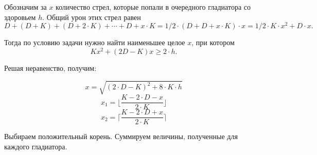 \solutionSection

Обозначим за $x$ количество стрел, которые попали в очередного гладиатора со здоровьем $h$. Общий урон этих стрел равен 
$$D + (D + K) + (D + 2\cdot K) + \cdots + D + x \cdot  K = 1/2 \cdot  (D + D + x \cdot  K) \cdot  x = 1/2 \cdot  K\cdot x^2 + D\cdot x.$$

Тогда по условию задачи нужно найти наименьшее целое $x$, при котором 
$$Kx^2 + (2D - K)x \ge 2 \cdot  h.$$

Решая неравенство, получим:

$$x = \sqrt{(2\cdot D - K)^2 + 8\cdot K\cdot h}$$
$$x_1 = \lfloor\frac{K - 2\cdot D - x}{2\cdot K}\rfloor$$
$$x_2 = \lceil\frac{K - 2\cdot D + x}{2\cdot K}\rceil$$

Выбираем положительный корень. Суммируем величины, полученные для каждого гладиатора.

\codeExample

